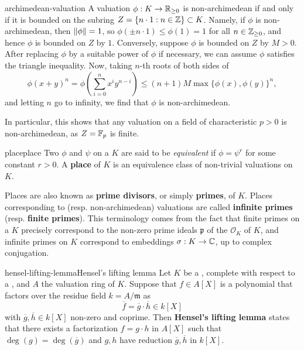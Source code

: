\begin{example}{archimedean-valuation}
    A valuation $\phi : K \to \mathbb{R}_{\ge 0}$ is non-archimedean if and only if it is bounded on the subring $Z = \{ n \cdot 1 : n \in \mathbb{Z} \} \subset K$. Namely, if $\phi$ is non-archimedean, then $\left\|\phi\right\| = 1$, so $\phi(\pm n \cdot 1) \le \phi(1) = 1$ for all $n \in \mathbb{Z}_{\ge 0}$, and hence $\phi$ is bounded on $Z$ by $1$. Conversely, suppose $\phi$ is bounded on $Z$ by $M > 0$. After replacing $\phi$ by a suitable power of $\phi$ if necessary, we can assume $\phi$ satisfies the triangle inequality. Now, taking $n$-th roots of both sides of
    \[ \phi(x + y)^n = \phi \left( \sum_{i = 0}^{n} x^i y^{n - i} \right) \le (n + 1) M \max \{ \phi(x), \phi(y) \}^n , \]
    and letting $n$ go to infinity, we find that $\phi$ is non-archimedean.
    
    In particular, this shows that any valuation on a field of characteristic $p > 0$ is non-archimedean, as $Z = \mathbb{F}_p$ is finite.
\end{example}

\begin{topic}{place}{place}
    Two  $\phi$ and $\psi$ on a  $K$ are said to be \textit{equivalent} if $\phi = \psi^r$ for some constant $r > 0$. A \textbf{place} of $K$ is an equivalence class of non-trivial valuations on $K$.
    
    Places are also known as \textbf{prime divisors}, or simply \textbf{primes}, of $K$. Places corresponding to  (resp. non-archimedean) valuations are called \textbf{infinite primes} (resp. \textbf{finite primes}). This terminology comes from the fact that finite primes on a  $K$ precisely correspond to the non-zero prime ideals $\mathfrak{p}$ of the  $\mathcal{O}_K$ of $K$, and infinite primes on $K$ correspond to embeddings $\sigma : K \to \mathbb{C}$, up to complex conjugation.
\end{topic}

    

\begin{topic}{hensel-lifting-lemma}{Hensel's lifting lemma}
    Let $K$ be a , complete with respect to a  , and $A$ the valuation ring of $K$.
    Suppose that $f \in A[X]$ is a polynomial that factors over the residue field $k = A / \mathfrak{m}$ as
    \[ \overline{f} = \overline{g} \cdot \overline{h} \in k[X] \]
    with $\overline{g}, \overline{h} \in k[X]$ non-zero and coprime. Then \textbf{Hensel's lifting lemma} states that there exists a factorization $f = g \cdot h$ in $A[X]$ such that $\deg(g) = \deg(\overline{g})$ and $g, h$ have reduction $\overline{g}, \overline{h}$ in $k[X]$.
\end{topic}

